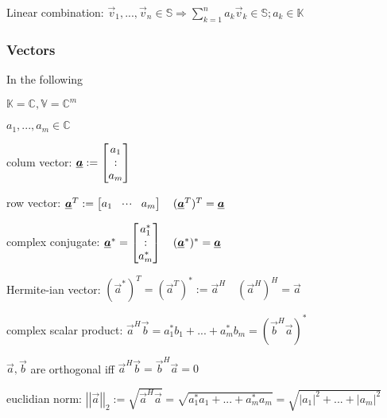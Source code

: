Linear combination: $\vec{v}_1, ... , \vec{v}_n\in\mathbb{S}\Rightarrow \sum\limits_{k=1}^{n}a_k\vec{v}_k \in \mathbb{S}; a_k\in\mathbb{K}$


\subsubsection{Vectors}
\begin{doublespace}


In the following 

$\mathbb{K}=\mathbb{C}, \mathbb{V}=\mathbb{C}^m$

$a_1,...,a_m\in\mathbb{C}$

colum vector: $\underline{\boldsymbol {a}}:=\begin{bmatrix}a_1\\:\\a_m\end{bmatrix} $

row vector: $\underline{\boldsymbol {a}}^T:=\begin{bmatrix}a_1&\!\cdot \!\cdot\!\cdot\!&a_m\end{bmatrix} \quad (\underline{\boldsymbol {a}}^T)^T=\underline{\boldsymbol {a}}$

complex conjugate: $\underline{\boldsymbol {a}}^*=\begin{bmatrix}a_1^*\\:\\a_m^*\end{bmatrix}\quad (\underline{\boldsymbol {a}}^*)^*=\underline{\boldsymbol {a}}$

Hermite-ian vector: $(\vec{a}^*)^T=(\vec{a}^T)^*:= \vec{a}^H \quad (\vec{a}^H)^H=\vec{a}$

complex scalar product: $\vec{a}^H\vec{b}=a_1^*b_1+...+a_m^*b_m=(\vec{b}^H\vec{a})^*$

$\vec{a},\vec{b}$ are orthogonal iff $\vec{a}^H\vec{b}=\vec{b}^H\vec{a}=0$

euclidian norm: $\left|\left|\vec{a}\right|\right|_2:=\sqrt{\vec{a}^H\vec{a}}=\sqrt{a_1^*a_1+...+a_m^*a_m}=\sqrt{\left|a_1\right|^2+...+\left|a_m\right|^2}$


\end{doublespace}
